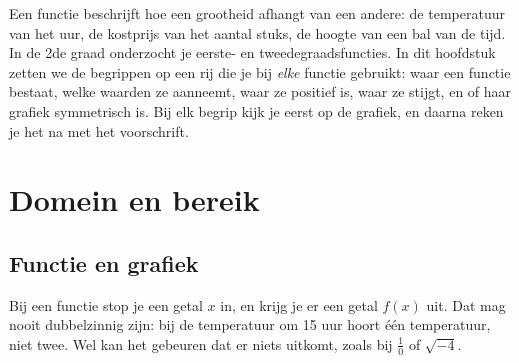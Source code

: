 %



Een functie beschrijft hoe een grootheid afhangt van een andere: de temperatuur van het uur, de kostprijs van het aantal stuks, de hoogte van een bal van de tijd. In de 2de graad onderzocht je eerste- en tweedegraadsfuncties. In dit hoofdstuk zetten we de begrippen op een rij die je bij \textit{elke} functie gebruikt: waar een functie bestaat, welke waarden ze aanneemt, waar ze positief is, waar ze stijgt, en of haar grafiek symmetrisch is. Bij elk begrip kijk je eerst op de grafiek, en daarna reken je het na met het voorschrift.

\begin{oefeningen}[Start]

\end{oefeningen}

\section{Domein en bereik}

\subsection{Functie en grafiek}

Bij een functie stop je een getal $x$ in, en krijg je er een getal $f(x)$ uit. Dat mag nooit dubbelzinnig zijn: bij de temperatuur om 15 uur hoort één temperatuur, niet twee. Wel kan het gebeuren dat er niets uitkomt, zoals bij $\frac10$ of $\sqrt{-4}$.

